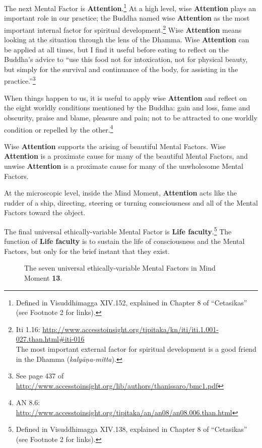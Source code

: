 The next Mental Factor is \textbf{Attention}.\footnote{Defined in Visuddhimagga XIV.152, explained in Chapter 8 of “Cetasikas” (see Footnote 2 for links).} At a high level, wise \textbf{Attention} plays an important role in our practice; the Buddha named wise \textbf{Attention} as the most important internal factor for spiritual development.\footnote{Iti 1.16: \url{http://www.accesstoinsight.org/tipitaka/kn/iti/iti.1.001-027.than.html\#iti-016} \\ The most important external factor for spiritual development is a good friend in the Dhamma (\textit{kalyāṇa-mitta}).} Wise \textbf{Attention} means looking at the situation through the lens of the Dhamma. Wise \textbf{Attention} can be applied at all times, but I find it useful before eating to reflect on the Buddha’s advice to “use this food not for intoxication, not for physical beauty, but simply for the survival and continuance of the body, for assisting in the practice.”\footnote{See page 437 of \url{http://www.accesstoinsight.org/lib/authors/thanissaro/bmc1.pdf}}

When things happen to us, it is useful to apply wise \textbf{Attention} and reflect on the eight worldly conditions mentioned by the Buddha: gain and loss, fame and obscurity, praise and blame, pleasure and pain; not to be attracted to one worldly condition or repelled by the other.\footnote{AN 8.6: \url{http://www.accesstoinsight.org/tipitaka/an/an08/an08.006.than.html}}

Wise \textbf{Attention} supports the arising of beautiful Mental Factors. Wise \textbf{Attention} is a proximate cause for many of the beautiful Mental Factors, and unwise \textbf{Attention} is a proximate cause for many of the unwholesome Mental Factors.

At the microscopic level, inside the Mind Moment, \textbf{Attention} acts like the rudder of a ship, directing, steering or turning consciousness and all of the Mental Factors toward the object. 

The final universal ethically-variable Mental Factor is \textbf{Life faculty}.\footnote{Defined in Visuddhimagga XIV.138, explained in Chapter 8 of “Cetasikas” (see Footnote 2 for links).} The function of \textbf{Life faculty} is to sustain the life of consciousness and the Mental Factors, but only for the brief instant that they exist.

\begin{figure}[H]
\centering

\caption{The seven universal ethically-variable Mental Factors in Mind Moment \textbf{13}.}
\label{fig:Eye-cons}
\end{figure}

